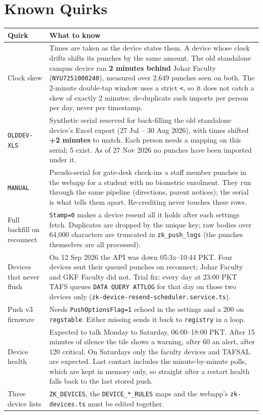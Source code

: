 \documentclass[11pt]{article}
\begin{document}
\section{Known Quirks}\label{sec:quirks}
\begin{longtable}{@{}p{} p{}@{}}
\toprule
\textbf{Quirk} & \textbf{What to know} \\
\midrule
\endhead
Clock skew & Times are taken as the device states them. A device whose clock drifts shifts its punches by the same
  amount. The old standalone campus device ran \textbf{2 minutes behind} Johar Faculty (\texttt{NYU7251000240}),
  measured over 2,649 punches seen on both. The 2-minute double-tap window uses a strict \texttt{<}, so it does not
  catch a skew of exactly 2 minutes: de-duplicate such imports per person per day, never per timestamp. \\
\texttt{OLDDEV-XLS} & Synthetic serial reserved for back-filling the old standalone device's Excel export
  (27 Jul -- 30 Aug 2026), with times shifted \textbf{+2 minutes} to match. Each person needs a mapping on this serial;
  5 exist. As of 27 Nov 2026 no punches have been imported under it. \\
\texttt{MANUAL} & Pseudo-serial for gate-desk check-ins a staff member punches in the webapp for a student with no
  biometric enrolment. They run through the same pipeline (directions, parent notices); the serial is what tells them
  apart. Re-crediting never touches these rows. \\
Full backfill on reconnect & \texttt{Stamp=0} makes a device resend all it holds after each settings fetch. Duplicates
  are dropped by the unique key; raw bodies over 64,000 characters are truncated in \texttt{zk\_push\_logs} (the
  punches themselves are all processed). \\
Devices that never flush & On 12 Sep 2026 the API was down 05:3x--10:44 PKT. Four devices sent their queued punches on
  reconnect; Johar Faculty and GKF Faculty did not. Trial fix: every day at 23:00 PKT TAFS queues
  \texttt{DATA QUERY ATTLOG} for that day on those two devices only (\texttt{zk-device-resend-scheduler.service.ts}). \\
Push v3 firmware & Needs \texttt{PushOptionsFlag=1} echoed in the settings and a 200 on \texttt{regstable}. Either
  missing sends it back to \texttt{registry} in a loop. \\
Device health & Expected to talk Monday to Saturday, 06:00--18:00 PKT. After 15 minutes of silence the tile shows a
  warning, after 60 an alert, after 120 critical. On Saturdays only the faculty devices and TAFSAL are expected. Last
  contact includes the minute-by-minute polls, which are kept in memory only, so straight after a restart health falls
  back to the last stored push. \\
Three device lists & \texttt{ZK\_DEVICES}, the \texttt{DEVICE\_*\_RULES} maps and the webapp's \texttt{zk-devices.ts}
  must be edited together. \\
\bottomrule
\end{longtable}
\end{document}
